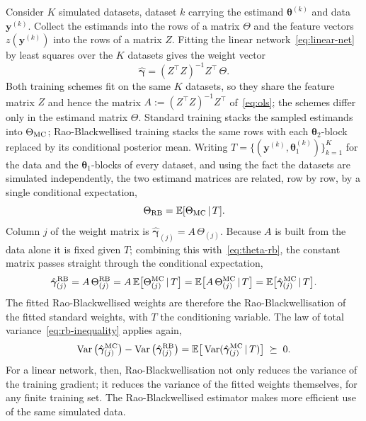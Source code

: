 Consider $K$ simulated datasets, dataset $k$ carrying the estimand
$\bm{\theta}^{(k)}$ and data $\mathbf{y}^{(k)}$. Collect the estimands
into the rows of a matrix $\Theta$ and the feature vectors
$z(\mathbf{y}^{(k)})$ into the rows of a matrix $Z$. Fitting the
linear network~\eqref{eq:linear-net} by least squares over the $K$
datasets gives the weight vector
%
\begin{equation}
  \hat{\bm{\gamma}}
  = (Z^{\!\top} Z)^{-1} Z^{\!\top}\, \Theta.
  \label{eq:ols}
\end{equation}
%
Both training schemes fit on the same $K$ datasets, so they share the
feature matrix $Z$ and hence the matrix
$A := (Z^{\!\top}Z)^{-1}Z^{\!\top}$ of~\eqref{eq:ols}; the schemes
differ only in the estimand matrix $\Theta$. Standard training stacks
the sampled estimands into $\Theta_{\mathrm{MC}}$; Rao-Blackwellised training
stacks the same rows with each $\bm{\theta}_2$-block replaced by its
conditional posterior mean. Writing
$T = \{(\mathbf{y}^{(k)}, \bm{\theta}_1^{(k)})\}_{k=1}^{K}$ for the
data and the $\bm{\theta}_1$-blocks of every dataset, and using the fact
the datasets are simulated independently, the two estimand matrices
are related, row by row, by a single conditional expectation,
%
\begin{equation}
  \Theta_{\mathrm{RB}} = \mathbb{E}[\Theta_{\mathrm{MC}} \,|\, T].
  \label{eq:theta-rb}
\end{equation}
%
Column $j$ of the weight matrix is $\hat{\bm{\gamma}}_{(j)} =
A\,\Theta_{(j)}$. Because $A$ is built from the data alone it is fixed
given $T$; combining this with~\eqref{eq:theta-rb}, the constant
matrix passes straight through the conditional expectation,
%
\begin{equation}
  \hat{\bm{\gamma}}_{(j)}^{\mathrm{RB}}
  = A\,\Theta_{(j)}^{\mathrm{RB}}
  = A\,\mathbb{E}\big[\Theta_{(j)}^{\mathrm{MC}} \,|\, T\big]
  = \mathbb{E}\big[A\,\Theta_{(j)}^{\mathrm{MC}} \,|\, T\big]
  = \mathbb{E}\big[\hat{\bm{\gamma}}_{(j)}^{\mathrm{MC}} \,|\, T\big].
  \label{eq:gamma-rb}
\end{equation}
%
The fitted Rao-Blackwellised weights are therefore the
Rao-Blackwellisation of the fitted standard weights, with $T$ the
conditioning variable. The law of total variance~\eqref{eq:rb-inequality}
applies again,
%
\begin{equation}
  \operatorname{Var}\big(\hat{\bm{\gamma}}_{(j)}^{\mathrm{MC}}\big)
  - \operatorname{Var}\big(\hat{\bm{\gamma}}_{(j)}^{\mathrm{RB}}\big)
  = \mathbb{E}\big[\operatorname{Var}(\hat{\bm{\gamma}}_{(j)}^{\mathrm{MC}} \,|\, T)\big]
  \;\succeq\; 0.
  \label{eq:linear-result}
\end{equation}
%
For a linear network, then, Rao-Blackwellisation not only reduces the variance of the training gradient; it reduces the variance
of the fitted weights themselves, for any finite training set.
The Rao-Blackwellised estimator makes more efficient use of the same
simulated data.

